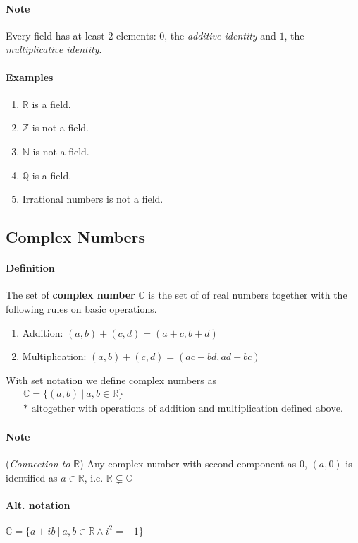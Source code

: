 \documentclass[11pt]{article}
\newcommand{\R}[0]{\mathbb{R}}
\newcommand{\definition}[0]{\paragraph{Definition}}
\newcommand{\C}[0]{\mathbb{C}}
\newcommand{\tx}[1]{\text{{#1}}}
\begin{document}
	\paragraph{Note} Every field has at least $2$ elements: $0$, the \emph{additive identity} and $1$, the \emph{multiplicative identity}.
	
	\paragraph{Examples}
	\begin{enumerate}
		\item $\R$ is a field.
		\item $\mathbb{Z}$ is not a field.
		\item $\mathbb{N}$ is not a field.
		\item $\mathbb{Q}$ is a field.
		\item Irrational numbers is not a field.
	\end{enumerate}
	
	\subsection{Complex Numbers}
	\definition The set of \textbf{complex number }$\C$ is the set of  of real numbers together with the following rules on basic operations.
	\begin{enumerate}
		\item Addition: $(a, b) + (c, d) = (a + c, b + d)$
		\item Multiplication: $(a, b) + (c, d) = (ac - bd, ad + bc)$
	\end{enumerate}
	With set notation we define complex numbers as 
	\begin{multline*}
		\C = \{(a, b)\ \vert\ a, b \in \R\} \\ 
		\tx{* altogether with operations of addition and multiplication defined above.}
	\end{multline*}
	\paragraph{Note} (\emph{Connection to $\R$}) Any complex number with second component as $0$, $(a, 0)$ is identified as $a \in \R$, i.e. $\R \subsetneq \C$
	\paragraph{Alt. notation} $\C = \{a + ib\ \vert\ a, b \in \R \land i^2 = -1 \}$
	
\end{document}
